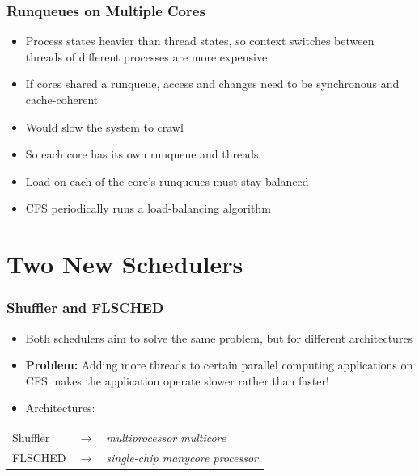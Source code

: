 \documentclass{beamer}
\newcommand{\linespace}{\vskip 0.25cm}
\begin{document}
\begin{frame}
\frametitle{Runqueues on Multiple Cores}

\begin{itemize}

	\item Process states heavier than thread states, so context switches between threads of different processes are more expensive

	\linespace

	\item If cores shared a runqueue, access and changes need to be synchronous and cache-coherent
	\item Would slow the system to crawl
	\item So each core has its own runqueue and threads
\end{itemize}

\linespace

\begin{itemize}
\item Load on each of the core's runqueues must stay balanced
\item CFS periodically runs a load-balancing algorithm
\end{itemize}
\end{frame}

\section[New Schedulers]{Two New Schedulers}

\begin{frame}
\frametitle{Shuffler and FLSCHED}
\begin{itemize}
\linespace

\item Both schedulers aim to solve the same problem, but for different architectures

\linespace

\item \textbf{Problem:} Adding more threads to certain parallel computing applications on CFS makes the application operate slower rather than faster!

\linespace

\item Architectures:
\end{itemize}
\begin{table}
\begin{tabular}{l c l}
Shuffler & $\rightarrow$ & \textit{multiprocessor multicore} \\
FLSCHED & $\rightarrow$ & \textit{single-chip manycore processor}\\
\end{tabular}
\end{table}

\end{frame}
\end{document}
